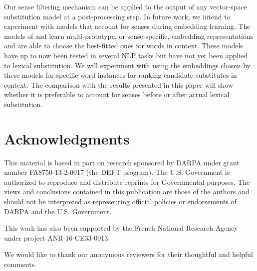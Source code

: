 \documentclass[11pt]{article}
\begin{document}
	Our sense filtering mechanism can be applied to the output of any vector-space substitution model at a post-processing step. In future work, we intend to experiment with models that account for senses during embedding learning. The models of  and  learn multi-prototype, or sense-specific, embedding representations and are able to choose the best-fitted ones for words in context. These models have up to now been tested in several NLP tasks but have not yet been applied to lexical substitution. We will experiment with using the embeddings chosen by these models for specific word instances for ranking candidate substitutes in context. The comparison with the results presented in this paper will show whether it is preferable to account for senses before or after actual lexical substitution.

	
\section*{Acknowledgments}

This material is based in part on research sponsored by DARPA under grant number FA8750-13-2-0017 (the DEFT program). The U.S. Government is authorized to reproduce and distribute reprints for Governmental purposes. The views and conclusions contained in this publication are those of the authors and should not be interpreted as representing official policies or endorsements of DARPA and the U.S. Government.

This work has also been supported by the French National Research Agency under project ANR-16-CE33-0013.

We would like to thank our anonymous reviewers for their thoughtful and helpful comments.

	
	
	
	
	
\end{document}
